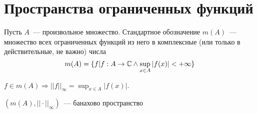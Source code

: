 \documentclass[document]{subfiles}
\begin{document}
\section{Пространства ограниченных функций}
\begin{definition}
    Пусть $A$~--- произвольное множество. Стандартное обозначение $m(A)$~--- множество всех ограниченных функций из него в комплексные (или только в действительные, не важно) числа
    \[ m(A) = \{ f | f: A \rightarrow \mathbb{C} \land \sup_{x \in A} |f(x)| < +\infty \} \]
\end{definition}

$f \in m(A) \Rightarrow ||f||_{\infty} = \sup_{x \in A} |f(x)|$.

\begin{theorem}
    $(m(A), || \cdot ||_{\infty})$~--- банахово пространство
\end{theorem}
\end{document}
